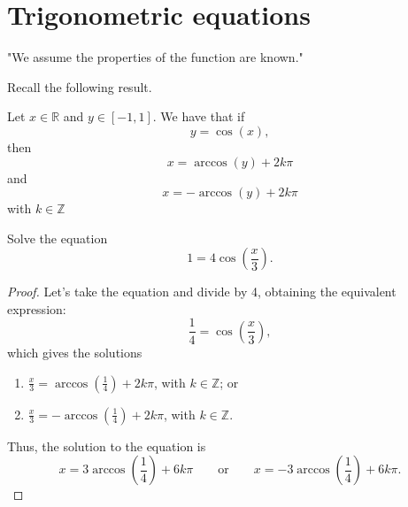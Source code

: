 \documentclass[letterpaper,11pt]{watml-notes}
\author{Author Name}
\date{\today}
\begin{document}
\generateHeader

\vspace*{-8mm}
\section{Trigonometric equations}

\begin{warning}
    "We assume the properties of the function are known."
\end{warning}

Recall the following result.
\begin{theorem}
    Let \( x \in \mathbb{R} \) and \( y \in [-1, 1] \). We have that if
\[
    y = \cos(x),
\]
then
\[
    x = \arccos(y) + 2k\pi
\]
and
\[
    x = -\arccos(y) + 2k\pi
\]
with \( k \in \mathbb{Z} \)
\end{theorem}

\begin{ex}
    Solve the equation
\[
    1 = 4\cos\left(\frac{x}{3}\right).
\]
\end{ex}

\begin{proof}
   Let's take the equation and divide by 4, obtaining the equivalent expression:
\[
\frac{1}{4} = \cos\left(\frac{x}{3}\right),
\]
which gives the solutions
\begin{enumerate}[label=\textit{\alph*)}]
    \item\label{ej01:c01} \(\displaystyle \frac{x}{3} = \arccos\left(\frac{1}{4}\right) + 2k\pi\), with \(k \in \mathbb{Z}\); or
    \item\label{ej01:c02} \(\displaystyle \frac{x}{3} = -\arccos\left(\frac{1}{4}\right) + 2k\pi\), with \(k \in \mathbb{Z}\).
\end{enumerate}
Thus, the solution to the equation is
\[
x = 3\arccos\left(\frac{1}{4}\right) + 6k\pi
\qquad\text{or}\qquad
x = -3\arccos\left(\frac{1}{4}\right) + 6k\pi.
\]
\end{proof}
\end{document}
